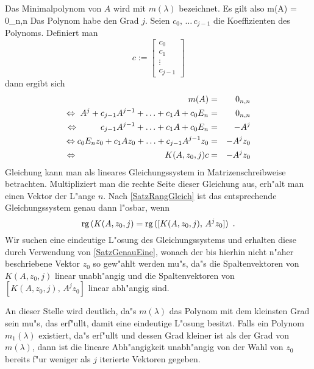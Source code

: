 Das Minimalpolynom von $A$ wird mit $m(\lambda)$ bezeichnet.
Es gilt also
    m(A) = 0_{n,n} \MyPunkt
\Eeq Das Polynom habe den Grad $j$.
Seien $c_0,\, \ldots\, c_{j-1}$ die Koeffizienten des Polynoms. 
Definiert man
\[
   c := \left[
        \begin{array}{c} c_0 \\ c_1 \\ \vdots \\ c_{j-1} \end{array}
        \right]
\]
dann ergibt sich
\begin{eqnarray} %
    m(A) & = & 0_{n,n} \nonumber
\\ \Leftrightarrow \hspace{1.2mm} \nonumber
    A^j + c_{j-1} A^{j-1} + \ldots + c_1 A + c_0 E_n & = & 0_{n,n}
\\ \Leftrightarrow \hspace{9.1mm} \nonumber
    c_{j-1} A^{j-1} + \ldots + c_1 A + c_0 E_n & = & - A^j
\\ \Leftrightarrow \nonumber
    c_0 E_n z_0 + c_1 A z_0 + \ldots + c_{j-1} A^{j-1} z_0 &
                                                         = & - A^j z_0
\\ \Leftrightarrow \hspace{3.6cm} \label{EquKrylovEqu}
    K(A,z_0,j) c & = & - A^j z_0
\end{eqnarray}
Gleichung  kann man als lineares Gleichungssystem
in Matrizenschreibweise betrachten. Multipliziert man die rechte Seite
dieser Gleichung aus, erh"alt man einen Vektor der L"ange $n$.
Nach \ref{SatzRangGleich} ist das entsprechende Gleichungssystem
genau dann l"osbar, wenn
\[ \mbox{\rm rg} \,(K(A,z_0,j) = \mbox{\rm rg} \,([K(A,z_0,j),\, A^j z_0]) \mbox{\hspace{0.5em}.} \]
Wir suchen eine eindeutige L"osung des Gleichungssystems und erhalten diese
durch Verwendung von \ref{SatzGenauEine}, wonach der bis hierhin
nicht n"aher beschriebene Vektor $z_0$ so gew"ahlt werden mu"s,
da"s die Spaltenvektoren von $K(A,z_0,j)$ linear unabh"angig und
die Spaltenvektoren von $[K(A,z_0,j),\, A^j z_0]$ linear abh"angig sind.

An dieser Stelle wird deutlich, da"s $m(\lambda)$ das Polynom mit dem
kleinsten Grad sein mu"s, das  erf"ullt, damit
 eine eindeutige L"osung besitzt. Falls ein
Polynom $m_1(\lambda)$ existiert, da"s  erf"ullt
und dessen Grad kleiner ist als der Grad von $m(\lambda)$, dann ist die
lineare Abh"angigkeit unabh"angig von der Wahl von $z_0$ bereits f"ur
weniger als $j$ iterierte Vektoren gegeben.

